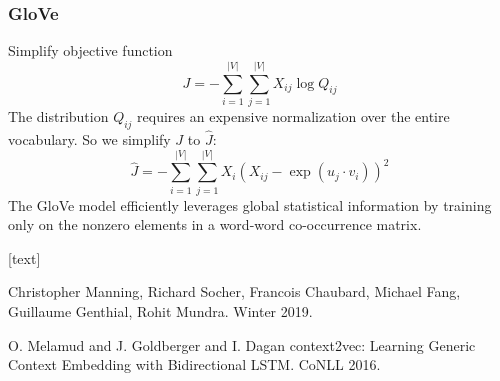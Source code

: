 \begin{frame}
\frametitle{GloVe}
\begin{alertblock}{Simplify objective function}
\[ J = - \sum_{i=1}^{|V|} \sum_{j=1}^{|V|} X_{ij} \log Q_{ij} \]
The distribution $Q_{ij}$ requires an expensive normalization over the entire vocabulary.
So we simplify $J$ to $\hat{J}$:
\[ \hat{J} = - \sum_{i=1}^{|V|} \sum_{j=1}^{|V|} X_i ( X_{ij} - \exp(u_j \cdot v_i) )^2 \]
The GloVe model efficiently leverages global statistical information by training only on the nonzero elements in a word-word co-occurrence matrix.
\end{alertblock}
\end{frame}


\begin{frame}
[text]
\begin{thebibliography}{10}

\alert{Christopher Manning, Richard Socher, Francois Chaubard, Michael Fang, Guillaume Genthial, Rohit Mundra.}
\newblock Winter 2019.


\alert{O. Melamud and J. Goldberger and I. Dagan}
\newblock context2vec: Learning Generic Context Embedding with Bidirectional LSTM.
\newblock CoNLL 2016.
\end{thebibliography}
\end{frame}





